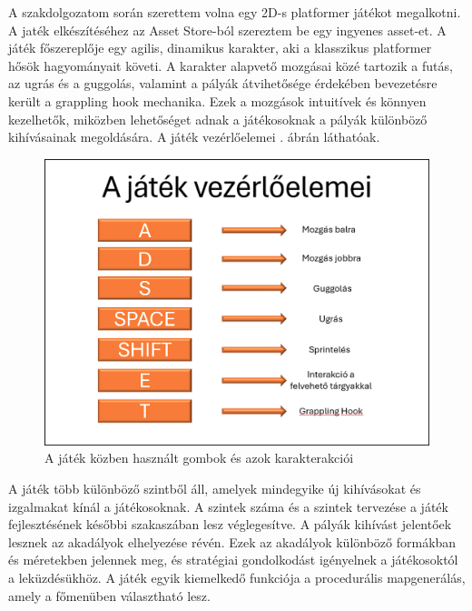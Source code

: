 

A szakdolgozatom során szerettem volna egy 2D-s platformer játékot megalkotni. A jaték elkészítéséhez az Asset Store-ból szereztem be egy ingyenes asset-et. A játék főszereplője egy agilis, dinamikus karakter, aki a klasszikus platformer hősök hagyományait követi. A karakter alapvető mozgásai közé tartozik a futás, az ugrás és a guggolás, valamint a pályák átvihetősége érdekében bevezetésre került a grappling hook mechanika. Ezek a mozgások intuitívek és könnyen kezelhetők, miközben lehetőséget adnak a játékosoknak a pályák különböző kihívásainak megoldására. A játék vezérlőelemei . ábrán láthatóak.

\begin{figure}[ht]
\centering
\includegraphics[scale = 0.3]{images/vezerloelemek.png}
\caption{A játék közben használt gombok és azok karakterakciói}
\label{fig:vezerloelemek}
\end{figure}

A játék több különböző szintből áll, amelyek mindegyike új kihívásokat és izgalmakat kínál a játékosoknak. A szintek száma és a szintek tervezése a játék fejlesztésének későbbi szakaszában lesz véglegesítve. A pályák kihívást jelentőek lesznek az akadályok elhelyezése révén. Ezek az akadályok különböző formákban és méretekben jelennek meg, és stratégiai gondolkodást igényelnek a játékosoktól a leküzdésükhöz. A játék egyik kiemelkedő funkciója a procedurális mapgenerálás, amely a főmenüben választható lesz. 

